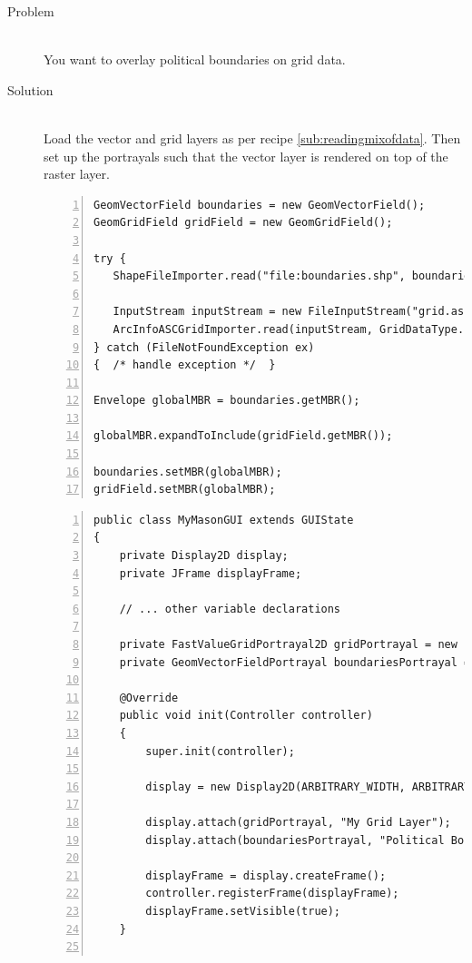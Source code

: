 \documentclass[twoside,10pt]{book}
\begin{document}
\begin{description}
\item[Problem]~\\
You want to overlay political boundaries on grid data.

\item[Solution]~\\
Load the vector and grid layers as per recipe
\ref{sub:readingmixofdata}.  Then set up the portrayals such that the
vector layer is rendered on top of the raster layer.

\begin{Verbatim}[frame=lines,label=Reading the layers,framesep=5mm,numbers=left,commandchars=+\[\]]
GeomVectorField boundaries = new GeomVectorField();
GeomGridField gridField = new GeomGridField();

try {
   ShapeFileImporter.read("file:boundaries.shp", boundaries);

   InputStream inputStream = new FileInputStream("grid.asc");
   ArcInfoASCGridImporter.read(inputStream, GridDataType.INTEGER, gridField);
} catch (FileNotFoundException ex)
{  /* handle exception */  }

Envelope globalMBR = boundaries.getMBR();

globalMBR.expandToInclude(gridField.getMBR());

boundaries.setMBR(globalMBR);
gridField.setMBR(globalMBR);
\end{Verbatim}

\begin{Verbatim}[frame=lines,label=Displaying boundaries over the grid,framesep=5mm,numbers=left,commandchars=+\[\]]
public class MyMasonGUI extends GUIState
{
    private Display2D display;
    private JFrame displayFrame;

    // ... other variable declarations

    private FastValueGridPortrayal2D gridPortrayal = new FastValueGridPortrayal2D();
    private GeomVectorFieldPortrayal boundariesPortrayal = new GeomVectorFieldPortrayal();

    @Override
    public void init(Controller controller)
    {
        super.init(controller);

        display = new Display2D(ARBITRARY_WIDTH, ARBITRARY_HEIGHT, this);

        display.attach(gridPortrayal, "My Grid Layer");
        display.attach(boundariesPortrayal, "Political Boundaries");

        displayFrame = display.createFrame();
        controller.registerFrame(displayFrame);
        displayFrame.setVisible(true);
    }


\end{Verbatim}
\end{description}
\end{document}

